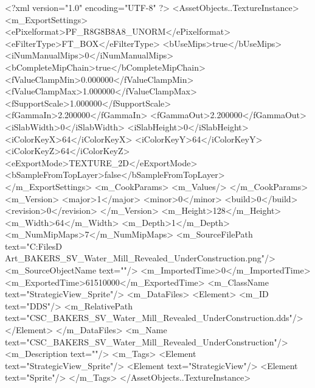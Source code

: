 <?xml version="1.0" encoding="UTF-8" ?>
<AssetObjects..TextureInstance>
	<m_ExportSettings>
		<ePixelformat>PF_R8G8B8A8_UNORM</ePixelformat>
		<eFilterType>FT_BOX</eFilterType>
		<bUseMips>true</bUseMips>
		<iNumManualMips>0</iNumManualMips>
		<bCompleteMipChain>true</bCompleteMipChain>
		<fValueClampMin>0.000000</fValueClampMin>
		<fValueClampMax>1.000000</fValueClampMax>
		<fSupportScale>1.000000</fSupportScale>
		<fGammaIn>2.200000</fGammaIn>
		<fGammaOut>2.200000</fGammaOut>
		<iSlabWidth>0</iSlabWidth>
		<iSlabHeight>0</iSlabHeight>
		<iColorKeyX>64</iColorKeyX>
		<iColorKeyY>64</iColorKeyY>
		<iColorKeyZ>64</iColorKeyZ>
		<eExportMode>TEXTURE_2D</eExportMode>
		<bSampleFromTopLayer>false</bSampleFromTopLayer>
	</m_ExportSettings>
	<m_CookParams>
		<m_Values/>
	</m_CookParams>
	<m_Version>
		<major>1</major>
		<minor>0</minor>
		<build>0</build>
		<revision>0</revision>
	</m_Version>
	<m_Height>128</m_Height>
	<m_Width>64</m_Width>
	<m_Depth>1</m_Depth>
	<m_NumMipMaps>7</m_NumMipMaps>
	<m_SourceFilePath text="C:\Users\Shadow\Desktop\Working Files\2D Art\Quarters\Bakers\StrategicView\CSC_BAKERS_SV_Water_Mill_Revealed_UnderConstruction.png"/>
	<m_SourceObjectName text=""/>
	<m_ImportedTime>0</m_ImportedTime>
	<m_ExportedTime>61510000</m_ExportedTime>
	<m_ClassName text="StrategicView_Sprite"/>
	<m_DataFiles>
		<Element>
			<m_ID text="DDS"/>
			<m_RelativePath text="CSC_BAKERS_SV_Water_Mill_Revealed_UnderConstruction.dds"/>
		</Element>
	</m_DataFiles>
	<m_Name text="CSC_BAKERS_SV_Water_Mill_Revealed_UnderConstruction"/>
	<m_Description text=""/>
	<m_Tags>
		<Element text="StrategicView_Sprite"/>
		<Element text="StrategicView"/>
		<Element text="Sprite"/>
	</m_Tags>
</AssetObjects..TextureInstance>

